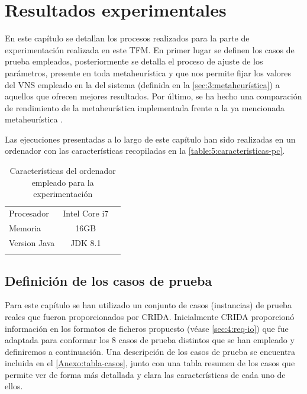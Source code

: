 \graphicspath{{capitulos/Capitulo5-Resultados-experimentales/recursos/}}

\section{Resultados experimentales} \label{capitulo:5}

En este capítulo se detallan los procesos realizados para la parte de experimentación realizada en este TFM. En primer lugar se definen los casos de prueba empleados, posteriormente se detalla el proceso de ajuste de los parámetros, presente en toda metaheurística y que nos permite fijar los valores del VNS empleado en la \fasedos{} del sistema (definida en la \autoref{sec:3:metaheurística}) a aquellos que ofrecen mejores resultados. Por último, se ha hecho una comparación de rendimiento de la metaheurística implementada frente a la ya mencionada metaheurística \sa{}.

Las ejecuciones presentadas a lo largo de este capítulo han sido realizadas en un ordenador con las características recopiladas en la \autoref{table:5:caracteristicas-pc}.

\begin{table}[h]
	\centering
	\caption{Características del ordenador empleado para la experimentación}
	\begin{tabular}{lcc}
		\hline
		Procesador   & Intel Core i7 &  \\
		Memoria      &     16GB      &  \\
		Version Java &    JDK 8.1    &  \\ \hline
		             &               &
	\end{tabular}
\label{table:5:caracteristicas-pc}
\end{table}

\subsection{Definición de los casos de prueba}
\label{sec:5:def-casos}

Para este capítulo se han utilizado un conjunto de casos (instancias) de prueba reales que fueron proporcionados por CRIDA. Inicialmente CRIDA proporcionó información en los formatos de ficheros propuesto (véase \autoref{sec:4:req-io}) que fue adaptada para conformar los 8 casos de prueba distintos que se han empleado y definiremos a continuación. Una descripción de los casos de prueba se encuentra incluida en el \autoref{Anexo:tabla-casos}, junto con una tabla resumen de los casos que permite ver de forma más detallada y clara las características de cada uno de ellos.

